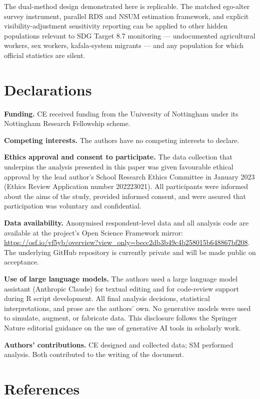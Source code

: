 \documentclass[
  12pt,
  letterpaper,
  DIV=11,
  numbers=noendperiod]{scrartcl}
\begin{document}
The dual-method design demonstrated here is replicable. The matched
ego-alter survey instrument, parallel RDS and NSUM estimation framework,
and explicit visibility-adjustment sensitivity reporting can be applied
to other hidden populations relevant to SDG Target 8.7 monitoring ---
undocumented agricultural workers, sex workers, kafala-system migrants
--- and any population for which official statistics are silent.

\section{Declarations}\label{sec-declarations}

\textbf{Funding.} CE received funding from the University of Nottingham
under its Nottingham Research Fellowship scheme.

\textbf{Competing interests.} The authors have no competing interests to
declare.

\textbf{Ethics approval and consent to participate.} The data collection
that underpins the analysis presented in this paper was given favourable
ethical approval by the lead author's School Research Ethics Committee
in January 2023 (Ethics Review Application number 202223021). All
participants were informed about the aims of the study, provided
informed consent, and were assured that participation was voluntary and
confidential.

\textbf{Data availability.} Anonymised respondent-level data and all
analysis code are available at the project's Open Science Framework
mirror:
\url{https://osf.io/vf5yb/overview?view_only=becc2db3b49c4b258015b648867bf208}.
The underlying GitHub repository is currently private and will be made
public on acceptance.

\textbf{Use of large language models.} The authors used a large language
model assistant (Anthropic Claude) for textual editing and for
code-review support during R script development. All final analysis
decisions, statistical interpretations, and prose are the authors' own.
No generative models were used to simulate, augment, or fabricate data.
This disclosure follows the Springer Nature editorial guidance on the
use of generative AI tools in scholarly work.

\textbf{Authors' contributions.} CE designed and collected data; SM
performed analysis. Both contributed to the writing of the document.

\newpage

\section*{References}\label{references}

\printbibliography[heading=none]
\end{document}
